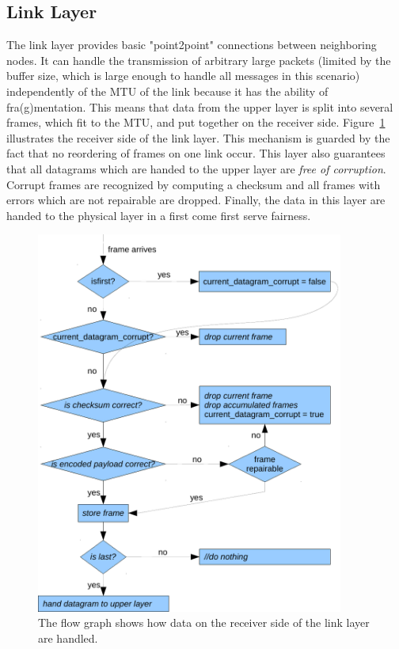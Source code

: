 \subsection{Link Layer}

The link layer provides basic "point2point" connections between neighboring nodes. It can handle the transmission of arbitrary large packets (limited by the buffer size, which is large enough to handle all messages in this scenario) independently of the MTU of the link because it has the ability of fra(g)mentation. This means that data from the upper layer is split into several frames, which fit to the MTU, and put together on the receiver side. Figure~\ref{fig:receiver-side-link-layer} illustrates the receiver side of the link layer.
This mechanism is guarded by the fact that no reordering of frames on one link occur. This layer also guarantees that all datagrams which are handed to the upper layer are \emph{free of corruption}. Corrupt frames are recognized by computing a checksum and all frames with errors which are not repairable are dropped.  Finally, the data in this layer are handed to the physical layer in a first come first serve fairness. 

\begin{figure}
  \centering
  \includegraphics[width=0.9\textwidth]{images/flowgraph_link_layer_receiver.pdf}
  \caption[Receiver side of link layer]{ The flow graph shows how data on the receiver side of the link layer are handled.}
  \label{fig:receiver-side-link-layer}
\end{figure}

